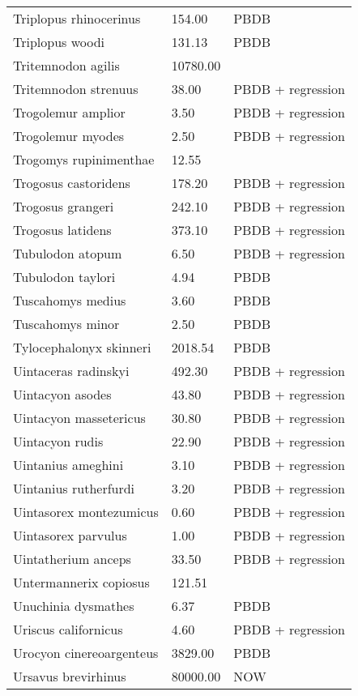 \documentclass{article}
\begin{document}
\begin{center}
\begin{longtable}{p{} p{} p{}}
    Triplopus rhinocerinus & 154.00 & PBDB \\ 
    Triplopus woodi & 131.13 & PBDB \\ 
    Tritemnodon agilis & 10780.00 & \cite{Egi2001} \\ 
    Tritemnodon strenuus & 38.00 & PBDB + regression \\ 
    Trogolemur amplior & 3.50 & PBDB + regression \\ 
    Trogolemur myodes & 2.50 & PBDB + regression \\ 
    Trogomys rupinimenthae & 12.55 & \cite{Tomiya2013} \\ 
    Trogosus castoridens & 178.20 & PBDB + regression \\ 
    Trogosus grangeri & 242.10 & PBDB + regression \\ 
    Trogosus latidens & 373.10 & PBDB + regression \\ 
    Tubulodon atopum & 6.50 & PBDB + regression \\ 
    Tubulodon taylori & 4.94 & PBDB \\ 
    Tuscahomys medius & 3.60 & PBDB \\ 
    Tuscahomys minor & 2.50 & PBDB \\ 
    Tylocephalonyx skinneri & 2018.54 & PBDB \\ 
    Uintaceras radinskyi & 492.30 & PBDB + regression \\ 
    Uintacyon asodes & 43.80 & PBDB + regression \\ 
    Uintacyon massetericus & 30.80 & PBDB + regression \\ 
    Uintacyon rudis & 22.90 & PBDB + regression \\ 
    Uintanius ameghini & 3.10 & PBDB + regression \\ 
    Uintanius rutherfurdi & 3.20 & PBDB + regression \\ 
    Uintasorex montezumicus & 0.60 & PBDB + regression \\ 
    Uintasorex parvulus & 1.00 & PBDB + regression \\ 
    Uintatherium anceps & 33.50 & PBDB + regression \\ 
    Untermannerix copiosus & 121.51 & \cite{Tomiya2013} \\ 
    Unuchinia dysmathes & 6.37 & PBDB \\ 
    Uriscus californicus & 4.60 & PBDB + regression \\ 
    Urocyon cinereoargenteus & 3829.00 & PBDB \\ 
    Ursavus brevirhinus & 80000.00 & NOW \\ 

\end{longtable}
\end{center}
\end{document}

